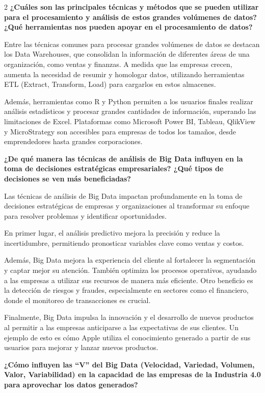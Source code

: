 \documentclass[12pt,spanish,Letterpaper,openany]{book}
\begin{document}
\begin {multicols}{2}
\textbf{¿Cuáles son las principales técnicas y métodos que se pueden utilizar para el procesamiento y análisis de estos grandes volúmenes de datos? ¿Qué herramientas nos pueden apoyar en el procesamiento de datos?}

Entre las técnicas comunes para procesar grandes volúmenes de datos se destacan los Data Warehouses, que consolidan la información de diferentes áreas de una organización, como ventas y finanzas. A medida que las empresas crecen, aumenta la necesidad de resumir y homologar datos, utilizando herramientas ETL (Extract, Transform, Load) para cargarlos en estos almacenes.

Además, herramientas como R y Python permiten a los usuarios finales realizar análisis estadísticos y procesar grandes cantidades de información, superando las limitaciones de Excel. Plataformas como Microsoft Power BI, Tableau, QlikView y MicroStrategy son accesibles para empresas de todos los tamaños, desde emprendedores hasta grandes corporaciones.

\textbf{¿De qué manera las técnicas de análisis de Big Data influyen en la toma de decisiones estratégicas empresariales? ¿Qué tipos de decisiones se ven más beneficiadas?}

Las técnicas de análisis de Big Data impactan profundamente en la toma de decisiones estratégicas de empresas y organizaciones al transformar su enfoque para resolver problemas y identificar oportunidades.

En primer lugar, el análisis predictivo mejora la precisión y reduce la incertidumbre, permitiendo pronosticar variables clave como ventas y costos.

Además, Big Data mejora la experiencia del cliente al fortalecer la segmentación y captar mejor su atención. También optimiza los procesos operativos, ayudando a las empresas a utilizar sus recursos de manera más eficiente. Otro beneficio es la detección de riesgos y fraudes, especialmente en sectores como el financiero, donde el monitoreo de transacciones es crucial.

Finalmente, Big Data impulsa la innovación y el desarrollo de nuevos productos al permitir a las empresas anticiparse a las expectativas de sus clientes. Un ejemplo de esto es cómo Apple utiliza el conocimiento generado a partir de sus usuarios para mejorar y lanzar nuevos productos.

\textbf{¿Cómo influyen las ``V'' del Big Data (Velocidad, Variedad, Volumen, Valor, Variabilidad) en la capacidad de las empresas de la Industria 4.0 para aprovechar los datos generados?}


\end{multicols}
\end{document}
